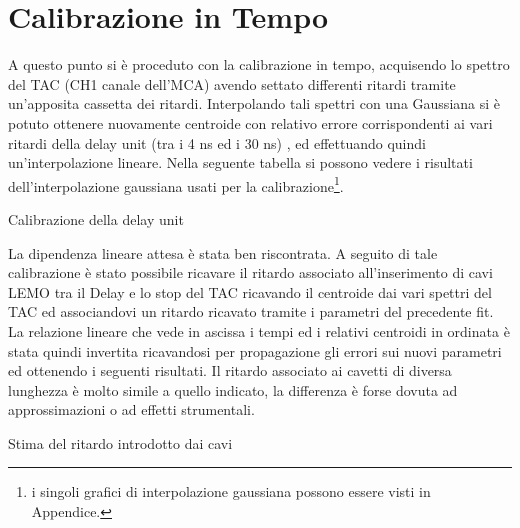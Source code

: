 


\section{Calibrazione in Tempo}

A questo punto si è proceduto con la calibrazione in tempo, acquisendo lo spettro del TAC (CH1 canale dell'MCA) avendo settato differenti ritardi tramite 
un'apposita cassetta dei ritardi. Interpolando tali spettri con una Gaussiana si è potuto ottenere nuovamente centroide con relativo 
errore corrispondenti ai vari ritardi della delay unit (tra i 4 ns ed i 30 ns) ,
ed effettuando quindi un'interpolazione lineare. Nella seguente tabella si possono vedere i risultati dell'interpolazione gaussiana usati per la calibrazione\footnote{i singoli grafici di interpolazione gaussiana possono essere visti in Appendice.}. \\
%
\begin{tabella}[h]
	\centering
	
	\caption{Calibrazione della delay unit}
	\label{tab:calib_delay}
\end{tabella}
%
%
%	
%

%

La dipendenza lineare attesa è stata ben riscontrata.
A seguito di tale calibrazione è stato possibile ricavare il ritardo associato all'inserimento di cavi LEMO tra il Delay e lo stop del TAC ricavando il centroide dai vari spettri del 
TAC ed associandovi un ritardo ricavato tramite i parametri del precedente fit. La relazione lineare che vede in ascissa i tempi ed i relativi centroidi in ordinata è stata 
quindi invertita ricavandosi per propagazione gli errori sui nuovi parametri ed ottenendo i seguenti risultati. Il ritardo associato ai cavetti di diversa lunghezza è molto simile
a quello indicato, la differenza è forse dovuta ad approssimazioni o ad effetti strumentali.\\

\begin{tabella}[h]
	\centering
	
	\caption{Stima del ritardo introdotto dai cavi}
	\label{tab:calib_cavi}
\end{tabella}
 
